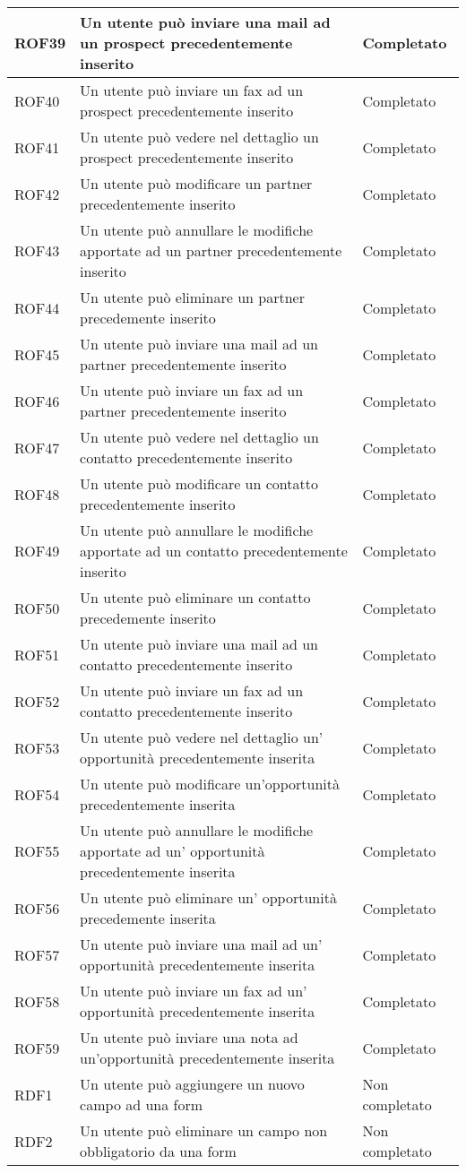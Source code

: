\begin{longtable}[H]{|p{5cm}|p{5cm}|p{3cm}|}
	\hline
	ROF39&Un utente può inviare una mail ad un prospect precedentemente inserito&Completato \\
	\hline
	ROF40&Un utente può inviare un fax ad un prospect precedentemente inserito&Completato \\
	\hline
	ROF41&Un utente può vedere nel dettaglio un prospect precedentemente inserito&Completato\\
	\hline
	ROF42&Un utente può modificare un partner precedentemente inserito&Completato\\
	\hline
	ROF43&Un utente può annullare le modifiche apportate ad un partner precedentemente inserito&Completato\\
	\hline
	ROF44&Un utente può eliminare un partner precedemente inserito&Completato\\
	\hline
	ROF45&Un utente può inviare una mail ad un partner precedentemente inserito&Completato \\
	\hline
	ROF46&Un utente può inviare un fax ad un partner precedentemente inserito&Completato \\
	\hline
	ROF47&Un utente può vedere nel dettaglio un contatto precedentemente inserito&Completato\\
	\hline
	ROF48&Un utente può modificare un contatto precedentemente inserito&Completato\\
	\hline
	ROF49&Un utente può annullare le modifiche apportate ad un contatto precedentemente inserito&Completato\\
	\hline
	ROF50&Un utente può eliminare un contatto precedemente inserito&Completato\\
	\hline
	ROF51&Un utente può inviare una mail ad un contatto precedentemente inserito&Completato \\
	\hline
	ROF52&Un utente può inviare un fax ad un contatto precedentemente inserito&Completato \\
	\hline
	ROF53&Un utente può vedere nel dettaglio un' opportunità precedentemente inserita&Completato\\
	\hline
	ROF54&Un utente può modificare un'opportunità precedentemente inserita&Completato\\
	\hline
	ROF55&Un utente può annullare le modifiche apportate ad un' opportunità precedentemente inserita&Completato\\
	\hline
	ROF56&Un utente può eliminare un' opportunità precedemente inserita&Completato\\
	\hline
	ROF57&Un utente può inviare una mail ad un' opportunità precedentemente inserita&Completato \\
	\hline
	ROF58&Un utente può inviare un fax ad un' opportunità precedentemente inserita&Completato \\
	\hline
	ROF59&Un utente può inviare una nota ad un'opportunità precedentemente inserita& Completato\\
	\hline
	RDF1&Un utente può aggiungere un nuovo campo ad una form&Non completato\\
	\hline
	RDF2&Un utente può eliminare un campo non obbligatorio da una form& Non completato \\
	\hline
	
\end{longtable}


